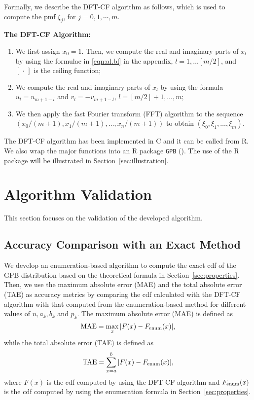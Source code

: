 \documentclass[12pt]{article}
\newcommand{\TAE}{{\rm TAE}}
\newcommand{\MAE}{{\rm MAE}}
\newcommand{\enum}{{\rm enum}}
\begin{document}
Formally, we describe the DFT-CF algorithm as follows, which is used to compute the pmf $\xi_j$, for $j=0,1,\cdots,m.$

\newpage
\textbf{The DFT-CF Algorithm:}
\begin{enumerate}
\item We first assign $x_0=1$. Then, we compute the real and imaginary parts of $x_l$ by using the formulae in \eqref{eqn:al.bl} in the appendix, $l=1,\dots [m/2]$,  and $[\,\cdot\,]$ is the ceiling function;
\item We compute the real and imaginary parts of $x_l$ by using the formula $u_l=u_{m+1-l}$ and $v_l=-v_{m+1-l}$, $l=[m/2]+1,\dots, m$;
\item We then apply the fast Fourier transform (FFT) algorithm to the sequence $(x_0/(m+1), x_1/(m+1),\dots,x_n/(m+1))$ to obtain $(\xi_0,\xi_1,\dots, \xi_m)$.
\end{enumerate}

The DFT-CF algorithm has been implemented in C and it can be called from R. We also wrap the major functions into an R package \texttt{GPB} (). The use of the R package will be illustrated in Section~\ref{sec:illustration}.

\section{Algorithm Validation}\label{sec:implementation}
This section focuses on the validation of the developed algorithm.

\subsection{Accuracy Comparison with an Exact Method}
We develop an enumeration-based algorithm to compute the exact cdf of the GPB distribution based on the theoretical formula in Section~\ref{sec:properties}. Then, we use the maximum absolute error (MAE) and the total absolute error (TAE) as accuracy metrics by comparing the cdf calculated with the DFT-CF algorithm with that computed from the enumeration-based method for different values of $n, a_k, b_k$ and $p_k$. The maximum absolute error (MAE) is defined as
$$\MAE=\max_{x}| F(x)- F_{\enum} (x)|,$$
while the total absolute error (TAE) is defined as
$$\TAE=\sum_{x=a}^{b} |F(x)- F_{\enum} (x)|,$$
where $ F(x)$ is the cdf computed by using the DFT-CF algorithm and $ F_{\enum}(x)$ is the cdf computed by using the enumeration formula in Section~\ref{sec:properties}.
\end{document}
